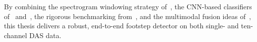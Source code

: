 \medskip
By combining the spectrogram windowing strategy of~\cite{ks2021acoustic}, the CNN-based classifiers of~\cite{footstep} and~\cite{zhou2024large}, the rigorous benchmarking from~\cite{Shi2025Benchmark}, and the multimodal fusion ideas of~\cite{Yadav2021Contrastive}, this thesis delivers a robust, end-to-end footstep detector on both single- and ten-channel DAS data.
